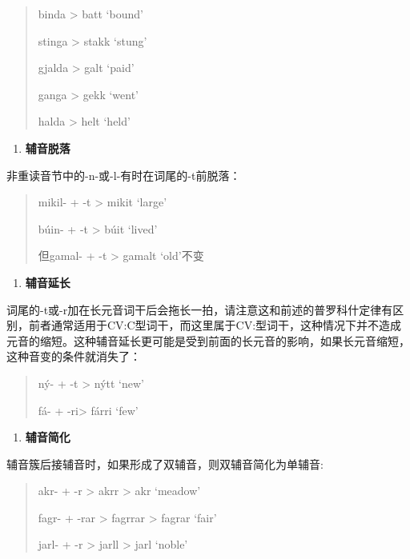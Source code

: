 \begin{quote}
  binda \textgreater{} batt `bound'

  stinga \textgreater{} stakk `stung'

  gjalda \textgreater{} galt `paid'

  ganga \textgreater{} gekk `went'

  halda \textgreater{} helt `held'
\end{quote}

\begin{enumerate}
  \def\labelenumi{\Alph{enumi}.}
  \setcounter{enumi}{2}
  \item
        \textbf{辅音脱落}
\end{enumerate}

非重读音节中的-n-或-l-有时在词尾的-t前脱落：

\begin{quote}
  mikil- + -t \textgreater{} mikit `large'

  búin- + -t \textgreater{} búit `lived'

  但gamal- + -t \textgreater{} gamalt `old'不变
\end{quote}

\begin{enumerate}
  \def\labelenumi{\Alph{enumi}.}
  \setcounter{enumi}{3}
  \item
        \label{_Ref116211616}{}\textbf{辅音延长}
\end{enumerate}

词尾的-t或-r加在长元音词干后会拖长一拍，请注意这和前述的普罗科什定律有区别，前者通常适用于CV:C型词干，而这里属于CV:型词干，这种情况下并不造成元音的缩短。这种辅音延长更可能是受到前面的长元音的影响，如果长元音缩短，这种音变的条件就消失了：

\begin{quote}
  ný- + -t \textgreater{} nýtt `new'

  fá- + -ri\textgreater{} fárri `few'
\end{quote}

\begin{enumerate}
  \def\labelenumi{\Alph{enumi}.}
  \setcounter{enumi}{4}
  \item
        \label{_Ref115765758}{}\textbf{辅音简化}
\end{enumerate}

辅音簇后接辅音时，如果形成了双辅音，则双辅音简化为单辅音:

\begin{quote}
  akr- + -r \textgreater{} akrr \textgreater{} akr `meadow'

  fagr- + -rar \textgreater{} fagrrar \textgreater{} fagrar `fair'

  jarl- + -r \textgreater{} jarll \textgreater{} jarl `noble'
\end{quote}

